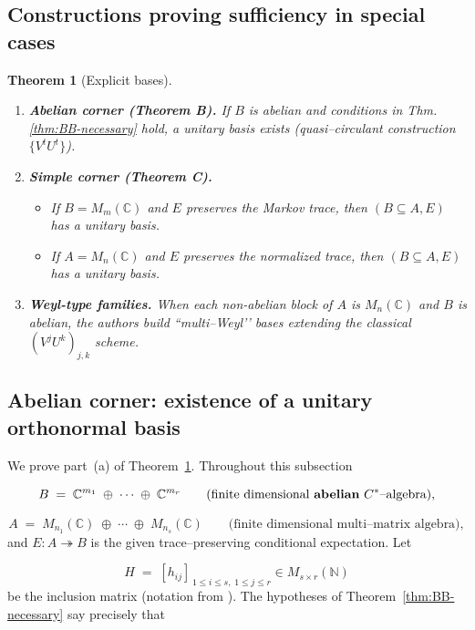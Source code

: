 \documentclass[11pt]{article}
\theoremstyle{mytheoremstyle}
\newtheorem{theorem}{Theorem}[section]
\theoremstyle{definition}
\theoremstyle{remark}
\newcommand{\bbC}{\mathbb{C}}
\newcommand{\bbN}{\mathbb{N}}
\newcommand{\Cst}{$C^{*}$}
\begin{document}
\subsection*{Constructions proving sufficiency in special cases}
\begin{theorem}[Explicit bases]\label{thm:BB-sufficient}
\leavevmode
\begin{enumerate}[label=\textup{(\alph*)}]
  \item \textbf{Abelian corner (Theorem B).}\; 
        If $B$ is abelian and conditions in
        Thm.\,\ref{thm:BB-necessary} hold,
        a unitary basis exists
        (quasi–circulant construction $\bigl\{V^{t}U^{t}\bigr\}$). 
  \item \textbf{Simple corner (Theorem C).}\; 
        \begin{itemize}[leftmargin=1.55em]
          \item If $B=M_m(\bbC)$ and $E$ preserves the Markov trace,
                then $(B\subseteq A,E)$ has a unitary basis.
          \item If $A=M_n(\bbC)$ and $E$ preserves the normalized trace,
                then $(B\subseteq A,E)$ has a unitary basis.
        \end{itemize}
  \item \textbf{Weyl-type families.}\; 
        When each non-abelian block of $A$ is $M_n(\bbC)$
        and $B$ is abelian,
        the authors build ``multi–Weyl’’ bases
        extending the classical $(V^{j}U^{k})_{j,k}$ scheme.
\end{enumerate}
\end{theorem}

\subsection{Abelian corner: existence of a unitary orthonormal basis}
\label{sec:abelian-corner}

We prove part~\textup{(a)} of Theorem~\ref{thm:BB-sufficient}.
Throughout this subsection

\[
  B \;=\; \bbC^{m_1}\;\oplus\;\cdots\;\oplus\;\bbC^{m_r}
  \qquad\text{(finite dimensional \textbf{abelian} \Cst–algebra)},
\]

\[
  A \;=\;M_{n_1}(\mathbb{C})\;\oplus\;\cdots\;\oplus\;M_{n_s}(\mathbb{C})
  \qquad\text{(finite dimensional multi–matrix algebra)},
\]
and
\( E : A \twoheadrightarrow B \)
is the given trace–preserving conditional expectation.
Let  

\[
  H \;=\;[h_{ij}]_{\,1\le i\le s,\;1\le j\le r}\in M_{s\times r}(\bbN)
\]
be the inclusion matrix (notation from \cite{BakshiBhat2025}).  
The hypotheses of Theorem~\ref{thm:BB-necessary} say precisely that  
\end{document}
